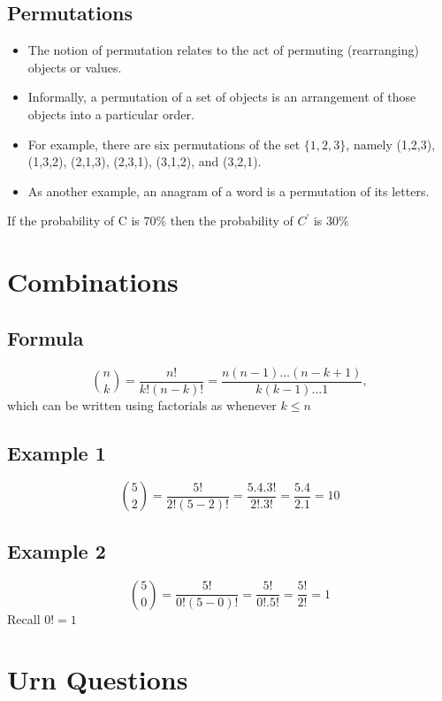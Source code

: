 \documentclass[12pt]{report}
\begin{document}
		\subsection{Permutations}
		\Large
		\begin{itemize}
			\item The notion of permutation relates to the act of permuting (rearranging) objects or values. 
			\item Informally, a permutation of a set of objects is an arrangement of those objects into a particular order. 
			
			\item For example, there are six permutations of the set $\{1,2,3\}$, namely (1,2,3), (1,3,2), (2,1,3), (2,3,1), (3,1,2), and (3,2,1). 
			\item As another example, an anagram of a word is a permutation of its letters. 
			
		\end{itemize}
		
If the probability of C is $70 \%$ then the probability of $C^{\prime}$ is $30\%$		

\section*{Combinations}

\subsection*{Formula}
\[ \binom nk  = \frac{n!}{k!(n-k)!} = \frac{n(n-1)\ldots(n-k+1)}{k(k-1)\dots 1},\]
which can be written using factorials as  whenever $k\leq n$

\subsection*{Example 1}

\[ \binom 5 2  = \frac{5!}{2!(5-2)!} = \frac{5.4.3!}{2! .3!} = \frac{5.4}{2.1} = 10\]

\subsection*{Example 2}

\[ \binom 5 0  = \frac{5!}{0!(5-0)!} = \frac{5!}{0! .5!} = \frac{5!}{2!} = 1\]
Recall $0! =1$
\section{Urn Questions}	
\end{document}
